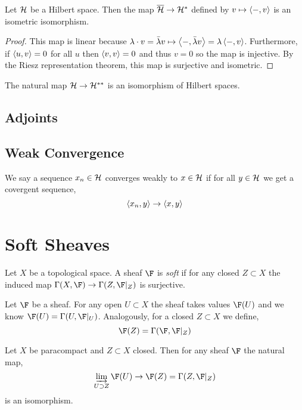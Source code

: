 \documentclass[12pt]{article}
\begin{document}
\begin{cor}
Let $\mathcal{H}$ be a Hilbert space. Then the map $\overline{\mathcal{H}} \to \mathcal{H}^*$ defined by $v \mapsto \left< - , v \right>$ is an isometric isomorphism.
\end{cor}

\begin{proof}
This map is linear because $\lambda \cdot v = \bar{\lambda} v \mapsto \left< - , \bar{\lambda} v \right> = \lambda \left< - , v \right>$. Furthermore, if $\left< u , v \right> = 0$ for all $u$ then $\left< v , v \right> = 0$ and thus $v = 0$ so the map is injective. By the Riesz representation theorem, this map is surjective and isometric.
\end{proof}

\begin{cor}
The natural map $\mathcal{H} \to \mathcal{H}^{**}$ is an isomorphism of Hilbert spaces.
\end{cor}

\subsection{Adjoints}

\subsection{Weak Convergence}

\begin{defn}
We say a sequence $x_n \in \mathcal{H}$ converges weakly to $x \in \mathcal{H}$ if for all $y \in \mathcal{H}$ we get a covergent sequence,
\[ \left< x_n , y \right> \to \left< x , y \right> \] 
\end{defn}


\section{Soft Sheaves}

\begin{defn}
Let $X$ be a topological space. A sheaf $\F$ is \textit{soft} if for any closed $Z \subset X$ the induced map $\Gamma(X, \F) \to \Gamma(Z, \F|_Z)$ is surjective.
\end{defn}

\begin{rmk}
Let $\F$ be a sheaf. For any open $U \subset X$ the sheaf takes values $\F(U)$ and we know $\F(U) = \Gamma(U, \F|_U)$. Analogously, for a closed $Z \subset X$ we define,
\[ \F(Z) = \Gamma(\F, \F|_Z) \] 
\end{rmk}

\begin{lemma}
Let $X$ be paracompact and $Z \subset X$ closed. Then for any sheaf $\F$ the natural map,
\[ \varinjlim_{U \supset Z} \F(U) \to \F(Z) = \Gamma(Z, \F|_Z) \]
is an isomorphism.
\end{lemma}
\end{document}
